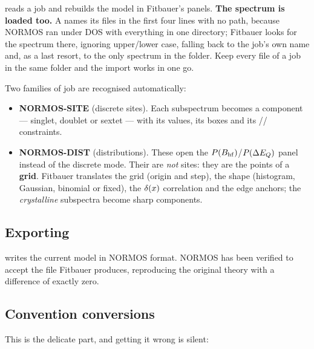  reads a job and rebuilds the
model in Fitbauer's panels. \textbf{The spectrum is loaded too.} A 
names its files in the first four lines with no path, because NORMOS ran under
DOS with everything in one directory; Fitbauer looks for the spectrum there,
ignoring upper/lower case, falling back to the job's own name and, as a last
resort, to the only spectrum in the folder. Keep every file of a job in the same
folder and the import works in one go.

Two families of job are recognised automatically:

\begin{itemize}[nosep]
  \item \textbf{NORMOS-SITE} (discrete sites). Each subspectrum becomes a
        component --- singlet, doublet or sextet --- with its values, its
         boxes and its //
        constraints.
  \item \textbf{NORMOS-DIST} (distributions). These open the
        $P(B_{\mathrm{hf}})$/$P(\Delta E_{Q})$ panel instead of the discrete mode. Their
         are \emph{not} sites: they are the points of a \textbf{grid}.
        Fitbauer translates the grid (origin and step), the shape (histogram,
        Gaussian, binomial or fixed), the $\delta(x)$ correlation and the edge
        anchors; the \emph{crystalline} subspectra become sharp components.
\end{itemize}

\subsection*{Exporting}

 writes the current model in
NORMOS format. NORMOS has been verified to accept the file Fitbauer produces,
reproducing the original theory with a difference of exactly zero.

\subsection*{Convention conversions}

This is the delicate part, and getting it wrong is silent:

